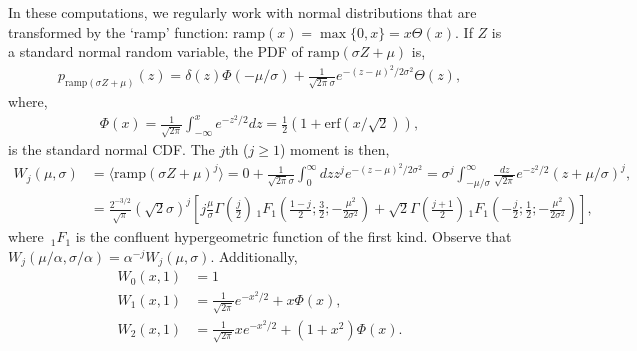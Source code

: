 \documentclass[10pt]{article}
\begin{document}
In these computations, we regularly work with normal distributions that are transformed by the `ramp' function: $\mathrm{ramp}(x) = \max\{0,x\} = x \Theta(x)$.
If $Z$ is a standard normal random variable, the PDF of $\mathrm{ramp}(\sigma Z + \mu)$ is,
\begin{align}
	p_{\mathrm{ramp}(\sigma Z + \mu)}(z)
	=
	\delta(z) \Phi(-\mu/\sigma)
	+
	\frac{1}{\sqrt{2\pi}\sigma} e^{-(z-\mu)^2 / 2\sigma^2}\Theta(z),
\end{align}
where,
\begin{align}
	\Phi(x)	= \frac{1}{\sqrt{2\pi}}\int_{-\infty}^x e^{-z^2/2} dz
	=
	\frac{1}{2}\left(
		1+\mathrm{erf}(x/\sqrt{2})
	\right),
\end{align}
is the standard normal CDF.
The $j$th ($j\geq 1$) moment is then,
\begin{align}
	W_j(\mu,\sigma)
	&=
	\langle\mathrm{ramp}(\sigma Z + \mu)^j\rangle
	=
	0+
	\frac{1}{\sqrt{2\pi}\sigma}
	\int_0^\infty 
	dz
	z^j
	e^{-(z-\mu)^2/2\sigma^2}
	=
	\sigma^j
	\int_{-\mu/\sigma}^\infty 
	\frac{dz}{\sqrt{2\pi}}
	e^{-z^2/2}
	( z+\mu/\sigma)^j,
	\\
	&=
	\frac{2^{-3/2}}{\sqrt{\pi}}(\sqrt{2} \sigma)^j
	\left[j\frac{\mu}{\sigma }  \Gamma \left(\frac{j}{2}\right) \, _1F_1\left(\frac{1-j}{2};\frac{3}{2};-\frac{\mu ^2}{2 \sigma ^2}\right)
	+
	\sqrt{2} \Gamma \left(\frac{j+1}{2}\right) \, _1F_1\left(-\frac{j}{2};\frac{1}{2};-\frac{\mu ^2}{2 \sigma ^2}\right)\right]
	,
\end{align}
where $\,_1 F_1$ is the confluent hypergeometric function of the first kind.
Observe that $W_j(\mu/\alpha , \sigma/\alpha) = \alpha^{-j}W_j(\mu,\sigma)$.
Additionally,
\begin{align}
	W_0(x,1)
	&= 1\\
	W_1(x,1)
	&=
	\frac{1}{\sqrt{2\pi}} e^{-x^2/2} + x \Phi(x),
	\\
	W_2(x,1)
	&=
	\frac{1}{\sqrt{2\pi}}x e^{-x^2/2} + (1+x^2) \Phi(x).
\end{align}
\end{document}
